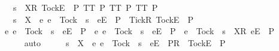 \ \ \ {\isachardoublequoteopen}s\ {\isacharat}\ {\isacharbrackleft}{\isacharbrackleft}X{\isacharbrackright}\isactrlsub R{\isacharcomma}\ {\isacharbrackleft}Tock{\isacharbrackright}\isactrlsub E{\isacharbrackright}\ {\isasymin}\ P{\isachardoublequoteclose}\ {\isachardoublequoteopen}TT{}\ P{\isachardoublequoteclose}\ {\isachardoublequoteopen}TT{}\ P{\isachardoublequoteclose}\ {\isachardoublequoteopen}TT{}\ P{\isachardoublequoteclose}\isanewline
\ \ \ {\isachardoublequoteopen}s\ {\isacharat}\ {\isacharbrackleft}{\isacharbrackleft}X\ {\isasymunion}\ {\isacharbraceleft}e{\isachardot}\ e\ {\isasymnoteq}\ Tock\ {\isasymand}\ s\ {\isacharat}\ {\isacharbrackleft}{\isacharbrackleft}e{\isacharbrackright}\isactrlsub E{\isacharbrackright}\ {\isasymnotin}\ P{\isacharbraceright}\ {\isasymunion}\ {\isacharbraceleft}Tick{\isacharbraceright}{\isacharbrackright}\isactrlsub R{\isacharcomma}\ {\isacharbrackleft}Tock{\isacharbrackright}\isactrlsub E{\isacharbrackright}\ {\isasymin}\ P{\isachardoublequoteclose}\isanewline
%
\isadelimproof
%
\endisadelimproof
%
\isatagproof
{}\isamarkupfalse%
\ {\isacharminus}\isanewline
\ \ \isamarkupfalse%
\ {\isachardoublequoteopen}{\isacharbraceleft}e{\isachardot}\ e\ {\isasymnoteq}\ Tock\ {\isasymand}\ s\ {\isacharat}\ {\isacharbrackleft}{\isacharbrackleft}e{\isacharbrackright}\isactrlsub E{\isacharbrackright}\ {\isasymnotin}\ P{\isacharbraceright}\ {\isasyminter}\ {\isacharbraceleft}e{\isachardot}\ {\isacharparenleft}e\ {\isasymnoteq}\ Tock\ {\isasymand}\ s\ {\isacharat}\ {\isacharbrackleft}{\isacharbrackleft}e{\isacharbrackright}\isactrlsub E{\isacharbrackright}\ {\isasymin}\ P{\isacharparenright}\ {\isasymor}\ {\isacharparenleft}e\ {\isacharequal}\ Tock\ {\isasymand}\ s\ {\isacharat}\ {\isacharbrackleft}{\isacharbrackleft}X{\isacharbrackright}\isactrlsub R{\isacharcomma}\ {\isacharbrackleft}e{\isacharbrackright}\isactrlsub E{\isacharbrackright}\ {\isasymin}\ P{\isacharparenright}\ {\isacharbraceright}\ {\isacharequal}\ {\isacharbraceleft}{\isacharbraceright}{\isachardoublequoteclose}\isanewline
\ \ \ \ \isamarkupfalse%
\ auto\isanewline
\ \ \isamarkupfalse%
\ \isamarkupfalse%
\ {\isachardoublequoteopen}s\ {\isacharat}\ {\isacharbrackleft}{\isacharbrackleft}X\ {\isasymunion}\ {\isacharbraceleft}e{\isachardot}\ e\ {\isasymnoteq}\ Tock\ {\isasymand}\ s\ {\isacharat}\ {\isacharbrackleft}{\isacharbrackleft}e{\isacharbrackright}\isactrlsub E{\isacharbrackright}\ {\isasymnotin}\ P{\isacharbraceright}{\isacharbrackright}\isactrlsub R{\isacharbrackright}\ {\isacharat}\ {\isacharbrackleft}{\isacharbrackleft}Tock{\isacharbrackright}\isactrlsub E{\isacharbrackright}\ {\isasymin}\ P{\isachardoublequoteclose}\isanewline
